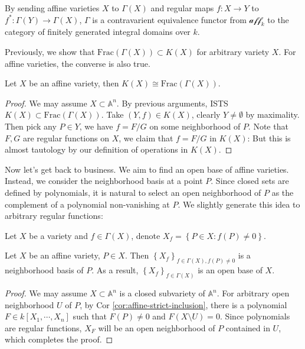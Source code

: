 \documentclass{note-eng}
\begin{document}
\begin{proposition}
    By sending affine varieties $X$ to $\Gamma(X)$ and regular maps $f: X \rightarrow Y$ to $f^\ast: \Gamma(Y) \rightarrow \Gamma(X)$, $\Gamma$ is a contravarient equivalence functor from $\mathscr{aff}_k$ to the category of finitely generated integral domains over $k$.
\end{proposition}

Previously, we show that $\mathrm{Frac}(\Gamma(X)) \subset K(X)$ for arbitrary variety $X$. For affine varieties, the converse is also true.

\begin{proposition}\label{prop:affine-rational-function-field-fraction}
    Let $X$ be an affine variety, then $K(X) \cong \mathrm{Frac}(\Gamma(X))$.
\end{proposition}

\begin{proof}
    We may assume $X \subset \mathbb{A}^n$. By previous arguments, ISTS $K(X) \subset \mathrm{Frac}(\Gamma(X))$. Take $(Y, f) \in K(X)$, clearly $Y \ne \emptyset$ by maximality. Then pick any $P \in Y$, we have $f = F / G$ on some neighborhood of $P$. Note that $F, G$ are regular functions on $X$, we claim that $f = F / G$ in $K(X)$: But this is almost tautology by our definition of operations in $K(X)$.
\end{proof}

Now let's get back to business. We aim to find an open base of affine varieties. Instead, we consider the neighborhood basis at a point $P$. Since closed sets are defined by polynomials, it is natural to select an open neighborhood of $P$ as the complement of a polynomial non-vanishing at $P$. We slightly generate this idea to arbitrary regular functions:

\begin{notation}
    Let $X$ be a variety and $f \in \Gamma(X)$, denote $X_f = \left\lbrace P \in X: f(P) \ne 0 \right\rbrace$.
\end{notation}

\begin{proposition}
    Let $X$ be an affine variety, $P \in X$. Then $\left\lbrace X_f \right\rbrace_{f \in \Gamma(X), f(P) \ne 0}$ is a neighborhood basis of $P$. As a result, $\left\lbrace X_f \right\rbrace_{f \in \Gamma(X)}$ is an open base of $X$.
\end{proposition}

\begin{proof}
    We may assume $X \subset \mathbb{A}^n$ is a closed subvariety of $\mathbb{A}^n$. For arbitrary open neighborhood $U$ of $P$, by Cor \ref{cor:affine-strict-inclusion}, there is a polynomial $F \in k[X_1, \cdots, X_n]$ such that $F(P) \ne 0$ and $F(X \setminus U) = 0$. Since polynomials are regular functions, $X_F$ will be an open neighborhood of $P$ contained in $U$, which completes the proof.
\end{proof}
\end{document}
